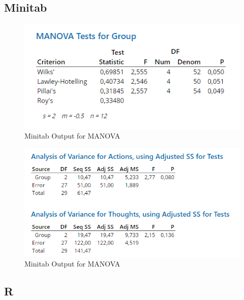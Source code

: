 \documentclass[
]{book}
\newenvironment{Shaded}{\begin{snugshade}}{\end{snugshade}}
\newcommand{\DataTypeTok}[1]{\textcolor[rgb]{0.13,0.29,0.53}{#1}}
\newcommand{\KeywordTok}[1]{\textcolor[rgb]{0.13,0.29,0.53}{\textbf{#1}}}
\newcommand{\NormalTok}[1]{#1}
\newcommand{\OperatorTok}[1]{\textcolor[rgb]{0.81,0.36,0.00}{\textbf{#1}}}
\newcommand{\StringTok}[1]{\textcolor[rgb]{0.31,0.60,0.02}{#1}}
\begin{document}
\hypertarget{minitab-6}{%
\subsection{Minitab}\label{minitab-6}}

\begin{figure}[!h]
\includegraphics{Screenshots/MANOVA/MANOVAminitab} \caption{\label{fig:manovaMinitab}Minitab Output for MANOVA}\label{fig:manovaMinitab}
\end{figure}

\begin{figure}[!h]
\includegraphics{Screenshots/MANOVA/ANOVASminitab} \caption{\label{fig:manovaMinitab2}Minitab Output for MANOVA}\label{fig:manovaMinitab2}
\end{figure}

\hypertarget{r-6}{%
\subsection{R}\label{r-6}}

\begin{Shaded}
\end{Shaded}
\end{document}
